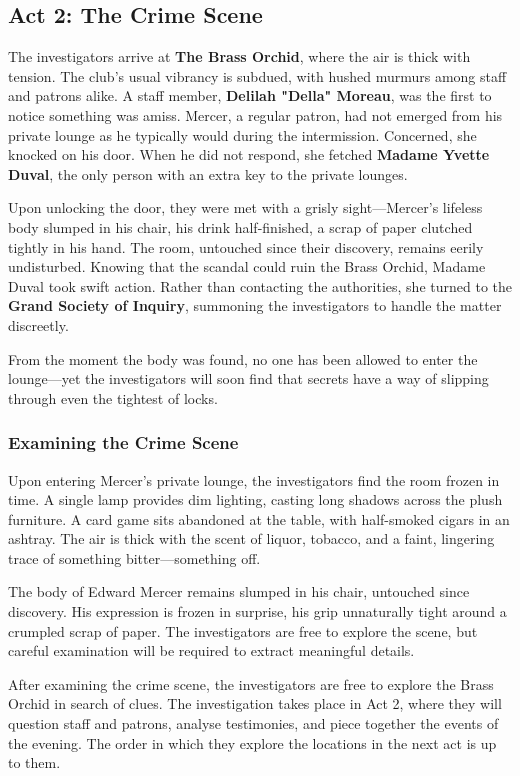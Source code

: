 \subsection{Act 2: The Crime Scene}


The investigators arrive at \textbf{The Brass Orchid}, where the air is thick with tension. The club’s usual vibrancy is subdued, with hushed murmurs among staff and patrons alike. A staff member, \textbf{Delilah "Della" Moreau}, was the first to notice something was amiss. Mercer, a regular patron, had not emerged from his private lounge as he typically would during the intermission. Concerned, she knocked on his door. When he did not respond, she fetched \textbf{Madame Yvette Duval}, the only person with an extra key to the private lounges. 

Upon unlocking the door, they were met with a grisly sight—Mercer’s lifeless body slumped in his chair, his drink half-finished, a scrap of paper clutched tightly in his hand. The room, untouched since their discovery, remains eerily undisturbed. Knowing that the scandal could ruin the Brass Orchid, Madame Duval took swift action. Rather than contacting the authorities, she turned to the \textbf{Grand Society of Inquiry}, summoning the investigators to handle the matter discreetly.

From the moment the body was found, no one has been allowed to enter the lounge—yet the investigators will soon find that secrets have a way of slipping through even the tightest of locks.


\subsubsection{Examining the Crime Scene}

Upon entering Mercer's private lounge, the investigators find the room frozen in time. A single lamp provides dim lighting, casting long shadows across the plush furniture. A card game sits abandoned at the table, with half-smoked cigars in an ashtray. The air is thick with the scent of liquor, tobacco, and a faint, lingering trace of something bitter—something off.

The body of Edward Mercer remains slumped in his chair, untouched since discovery. His expression is frozen in surprise, his grip unnaturally tight around a crumpled scrap of paper. The investigators are free to explore the scene, but careful examination will be required to extract meaningful details.

After examining the crime scene, the investigators are free to explore the Brass Orchid in search of clues. The investigation takes place in Act 2, where they will question staff and patrons, analyse testimonies, and piece together the events of the evening. The order in which they explore the locations in the next act is up to them.

